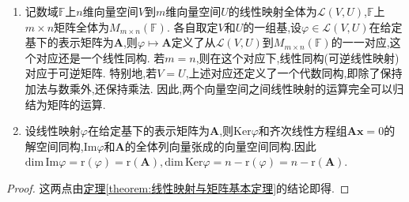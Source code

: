 \documentclass[../../main.tex]{subfiles}
\begin{document}
\begin{corollary}\label{corollary:线性映射与矩阵基本结论}
\begin{enumerate}[(1)]
\item\label{线性映射与矩阵基本结论1} 记数域\(\mathbb{F}\)上\(n\)维向量空间\(V\)到\(m\)维向量空间\(U\)的线性映射全体为\(\mathcal{L}(V,U)\),\(\mathbb{F}\)上\(m\times n\)矩阵全体为\(M_{m\times n}(\mathbb{F})\). 各自取定\(V\)和\(U\)的一组基,设\(\varphi\in\mathcal{L}(V,U)\)在给定基下的表示矩阵为\(\boldsymbol{A}\),则\(\varphi\mapsto\boldsymbol{A}\)定义了从\(\mathcal{L}(V,U)\)到\(M_{m\times n}(\mathbb{F})\)的一一对应,这个对应还是一个线性同构. 若\(m = n\),则在这个对应下,线性同构(可逆线性映射)对应于可逆矩阵. 特别地,若\(V = U\),上述对应还定义了一个代数同构,即除了保持加法与数乘外,还保持乘法. 因此,两个向量空间之间线性映射的运算完全可以归结为矩阵的运算.

\item\label{线性映射与矩阵基本结论2} 设线性映射\(\varphi\)在给定基下的表示矩阵为\(\boldsymbol{A}\),则\(\text{Ker}\varphi\)和齐次线性方程组\(\boldsymbol{A}\boldsymbol{x}=0\)的解空间同构,\(\text{Im}\varphi\)和\(\boldsymbol{A}\)的全体列向量张成的向量空间同构.因此$\mathrm{dim}\,\mathrm{Im}\varphi =\mathrm{r}\left( \varphi \right) =\mathrm{r}\left( \boldsymbol{A} \right) ,\mathrm{dim}\,\mathrm{Ker}\varphi =n-\mathrm{r}\left( \varphi \right) =n-\mathrm{r}\left( \boldsymbol{A} \right)$.
\end{enumerate}
\end{corollary}
\begin{proof}
这两点由\hyperref[theorem:线性映射与矩阵基本定理]{定理\ref{theorem:线性映射与矩阵基本定理}}的结论即得.

\end{proof}
\end{document}

